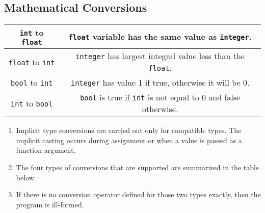 \subsection{Mathematical Conversions}
\begin{center}
	\begin{tabular}{ | c | c | } 
		\hline
		\lstinline|int| to \lstinline|float| & \lstinline|float| variable has the same value as \lstinline|integer|.\\
		\hline
		\lstinline|float| to \lstinline|int| & \lstinline|integer| has largest integral value less than the \lstinline|float|.\\
		\hline
		\lstinline|bool| to \lstinline|int| & \lstinline|integer| has value 1 if true, otherwise it will be 0.\\
		\hline
		\lstinline|int| to \lstinline|bool| & \lstinline|bool| is true if \lstinline|int| is not equal to 0 and false otherwise.\\
		\hline
	\end{tabular}
\end{center}
\begin{enumerate}
	\item Implicit type conversions are carried out only for compatible types. The implicit casting occurs during assignment or when a value is passed as a function argument.
	\item The four types of conversions that are supported are summarized in the table below.
	\item If there is no conversion operator defined for those two types exactly, then the program is ill-formed.
\end{enumerate}
